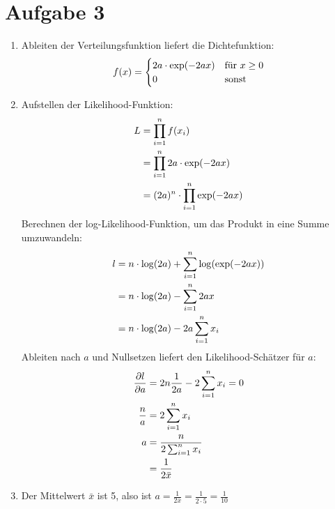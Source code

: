 \documentclass{article}
\begin{document}
	\section*{Aufgabe 3}
	\begin{enumerate}[label=(\alph*)]
		\item Ableiten der Verteilungsfunktion liefert die Dichtefunktion:
		\begin{align}
			f(x) = \begin{cases}
				2a\cdot \exp(-2ax) & \text{für } x\ge 0 \\
				0 &\text{sonst}
			\end{cases} \notag
		\end{align}
		\item Aufstellen der Likelihood-Funktion:
		\begin{align}
			L &= \prod_{i=1}^{n} f(x_i) \notag \\
			&= \prod_{i=1}^n 2a\cdot\exp(-2ax) \notag \\
			&= (2a)^n\cdot\prod_{i=1}^n \exp(-2ax) \notag
		\end{align}
		Berechnen der log-Likelihood-Funktion, um das Produkt in eine Summe umzuwandeln:
		\begin{align}
			l &= n\cdot\log(2a) + \sum_{i=1}^n\log(\exp(-2ax)) \notag \\
			&= n\cdot\log(2a) - \sum_{i=1}^n 2ax \notag \\
			&= n\cdot\log(2a) - 2a\sum_{i=1}^{n} x_i \notag
		\end{align}
		Ableiten nach $a$ und Nullsetzen liefert den Likelihood-Schätzer für $a$:
		\begin{align}
			\frac{\partial l}{\partial a} &= 2n\frac{1}{2a} - 2\sum_{i=1}^n x_i =0 \notag \\
			\frac{n}{a} &= 2\sum_{i=1}^n x_i \notag \\
			a &= \frac{n}{2\sum_{i=1}^n x_i} \notag \\
			&= \frac{1}{2\bar{x}} \notag
		\end{align}
		\item Der Mittelwert $\bar{x}$ ist 5, also ist $a=\frac{1}{2\bar{x}}=\frac{1}{2\cdot 5} = \frac{1}{10}$
	\end{enumerate}
\end{document}
